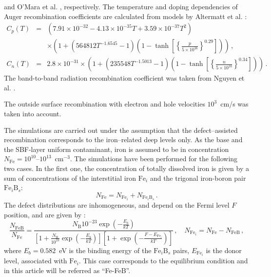 \documentclass[num-refs]{wiley-article} %
\begin{document}
and O'Mara et al. \cite{OMara}, respectively.
The temperature and doping dependencies of Auger recombination coefficients are calculated from models by Altermatt et al. \cite{Si_Auger}:
\begin{eqnarray}
   \nonumber C_{p} (T)&=& (7.91\times10^{-32}-4.13\times10^{-35}T+3.59\times10^{-37}T^2)\\
  &&\times\left(1+\left(564812T^{-1.6545}-1\right)\left(1-\tanh\left[\left\{\frac{p}{5\times10^{16}}\right\}^{0.29}\right]\right)\right)\,, \\
   C_{n} (T)&=& 2.8\times10^{-31}
  \times\left(1+\left(235548T^{-1.5013}-1\right)\left(1-\tanh\left[\left\{\frac{n}{5\times10^{16}}\right\}^{0.34}\right]\right)\right)\,.
\end{eqnarray}
The band-to-band radiation recombination coefficient was taken from Nguyen et al. \cite{Si_BtB}.

The outside surface recombination with electron and hole velocities $10^3$~cm/s was taken into account.

The simulations are carried out under the assumption that the defect–assisted recombination corresponds to the
iron–related deep levels only.
As the base and the SBF-layer uniform contaminant, iron is assumed to be in concentration
$N_{\mathrm{Fe}}=10^{10}$--$10^{13}$~cm$^{-3}$.
The simulations have been performed for the following two cases.
In the first one, the concentration of totally dissolved iron is given by a sum of
concentrations of the interstitial iron $\mathrm{Fe}_i$
and the trigonal iron-boron pair $\mathrm{Fe}_i\mathrm{B}_s$:
\begin{equation}\label{eqNFeB}
  N_{\mathrm{Fe}}=N_{\mathrm{Fe}_i}+N_{\mathrm{Fe}_i\mathrm{B}_s}\,.
\end{equation}
The defect distributions are inhomogeneous, and depend on the Fermi level $F$ position, and are given by
\cite{MurphyJAP2011,FeB:kinetic}:
\begin{equation}
\label{eqNFeB}
    \frac{N_{\mathrm{FeB}}}{N_{\mathrm{Fe}}}=\frac{N_\mathrm{B}10^{-23}\exp\left(-\frac{E_b}{kT}\right)}
     {\left[1+\frac{N_\mathrm{B}}{10^{23}}\exp\left(-\frac{E_b}{kT}\right)\right]\left[1+\exp\left(-\frac{F-E_{\mathrm{Fe}_i}}{kT}\right)\right]}\,,
     \quad N_{\mathrm{Fe}_i}=N_{\mathrm{Fe}}-N_{\mathrm{FeB}}\,,
\end{equation}
where
$E_b=0.582$~eV is the binding energy of the $\mathrm{Fe}_i\mathrm{B}_s$ pairs,
$E_{\mathrm{Fe}_i}$ is the donor level, associated with $\mathrm{Fe}_i$.
This case corresponds to the equilibrium condition and in this article will be referred as ``Fe-FeB''.
\end{document}
